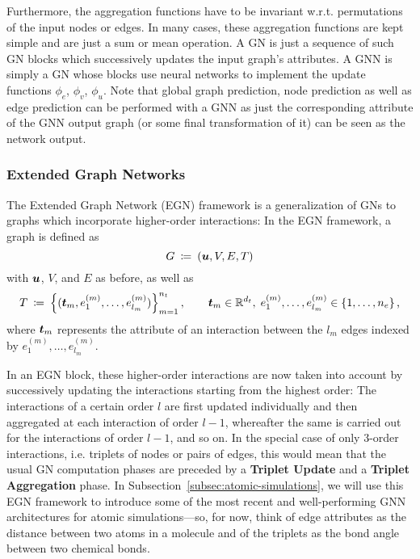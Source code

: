Furthermore, the aggregation functions have to be invariant w.r.t. permutations of the
input nodes or edges. In many cases,
these aggregation functions are kept simple and are just a sum or mean operation.
A GN is just a sequence of such GN blocks which successively updates the input graph's
attributes. A GNN is simply a GN whose blocks use neural networks to implement the
update functions $\phi_e$, $\phi_v$, $\phi_u$. Note that global graph prediction, 
node prediction as well as edge prediction can be performed with a GNN as just
the corresponding attribute of the GNN output graph (or some final transformation of it) can 
be seen as the network output.



\subsubsection{Extended Graph Networks}
\label{subsubsec:egns}

The Extended Graph Network (EGN) framework \cite[Section 2.1]{https://doi.org/10.48550/arxiv.2203.09697}
 is a generalization of GNs to graphs which 
incorporate higher-order interactions: In the EGN framework, a graph is defined as
\[ G \: \coloneqq \: (\boldsymbol{u}, V, E, T) \]
with $\boldsymbol{u}$, $V$, and $E$ as before, as well as
\begin{equation} 
    T \: \coloneqq \: \left\{(\boldsymbol{t}_m, e_1^{(m)}, \dots, e_{l_m}^{(m)})\right\}_{m=1}^{n_t}, 
    \qquad \boldsymbol{t}_m \in \mathbb{R}^{d_t}, \; 
    e_1^{(m)}, \dots, e_{l_m}^{(m)} \in \left\{1, \dots, n_e\right\} \text{,} 
    \label{eq:higher_order_interact}
\end{equation}
where $\boldsymbol{t}_m$ represents the attribute of an interaction between the $l_m$ edges indexed 
by $e_1^{(m)}, \dots, e_{l_m}^{(m)}$. 

In an EGN block, these higher-order interactions are now taken into account by 
successively updating the interactions starting from the highest order: The interactions
of a certain order $l$ are first updated individually and then aggregated at each
interaction of order $l-1$, whereafter the same is carried out for the interactions
of order $l-1$, and so on. In the special case of only $3$-order interactions, i.e.
triplets of nodes or pairs of edges, this would mean that the usual GN computation 
phases are preceded by a \textbf{Triplet Update} and a \textbf{Triplet Aggregation}
phase. In Subsection~\ref{subsec:atomic-simulations}, we will use this EGN framework
to introduce some of the most recent and well-performing GNN architectures for atomic 
simulations---so, for now, think of edge attributes as the distance between two
atoms in a molecule and of the triplets as the bond angle between two chemical bonds.
